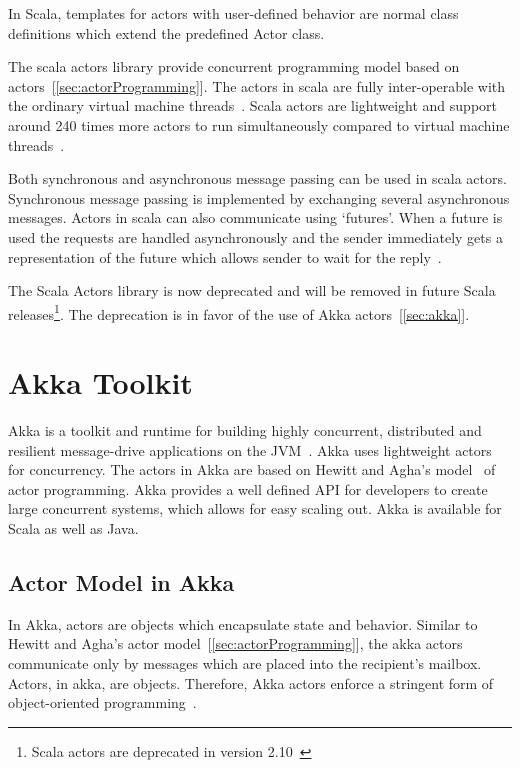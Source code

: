   In Scala, templates for actors with user-defined behavior are normal class definitions which extend the predefined Actor class.

  The scala actors library provide concurrent programming model based on actors~[\autoref{sec:actorProgramming}]. The actors in scala are fully inter-operable with the ordinary virtual machine threads~\cite{Haller}. Scala actors are lightweight and support around 240 times more actors to run simultaneously compared to virtual machine threads~\cite{Haller}.

  Both synchronous and asynchronous message passing can be used in scala actors. Synchronous message passing is implemented by exchanging several asynchronous messages. Actors in scala can also communicate using ‘futures’. When a future is used the requests are handled asynchronously and the sender immediately gets a representation of the future which allows sender to wait for the reply~\cite{scalaActors}.

  The Scala Actors library is now deprecated and will be removed in future Scala releases\footnote{Scala actors are deprecated in version 2.10~\cite{scalaActorsAPI}}. The deprecation is in favor of the use of Akka actors~[\autoref{sec:akka}].

\section{Akka Toolkit}
\label{sec:akka}
Akka is a toolkit and runtime for building highly concurrent, distributed and resilient message-drive applications on the JVM~\cite{akkaHome}. Akka uses lightweight actors for concurrency. The actors in Akka are based on Hewitt and Agha's model~\cite{agha, hewitt} of actor programming. Akka provides a well defined API for developers to create large concurrent systems, which allows for easy scaling out.
  Akka is available for Scala as well as Java.

  \subsection{Actor Model in Akka}
  In Akka, actors are objects which encapsulate state and behavior. Similar to Hewitt and Agha's actor model~[\autoref{sec:actorProgramming}], the akka actors communicate only by messages which are placed into the recipient’s mailbox. Actors, in akka, are objects. Therefore, Akka actors enforce a stringent form of object-oriented programming~\cite{akkaActorSystem}.

